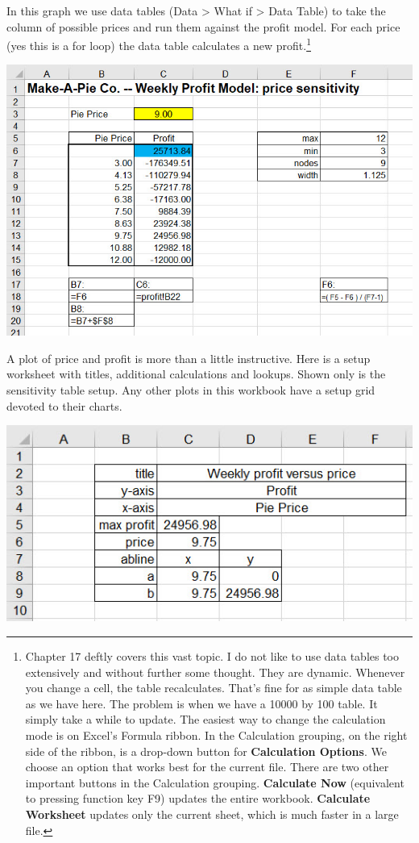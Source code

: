 \documentclass[
]{book}
\begin{document}
In this graph we use data tables (Data \textgreater{} What if \textgreater{} Data Table) to take the column of possible prices and run them against the profit model. For each price (yes this is a for loop) the data table calculates a new profit.\footnote{\citet{Winston2019} Chapter 17 deftly covers this vast topic. I do not like to use data tables too extensively and without further some thought. They are dynamic. Whenever you change a cell, the table recalculates. That's fine for as simple data table as we have here. The problem is when we have a 10000 by 100 table. It simply take a while to update. The easiest way to change the calculation mode is on Excel's Formula ribbon. In the Calculation grouping, on the right side of the ribbon, is a drop-down button for \textbf{Calculation Options}. We choose an option that works best for the current file. There are two other important buttons in the Calculation grouping. \textbf{Calculate Now} (equivalent to pressing function key F9) updates the entire workbook. \textbf{Calculate Worksheet} updates only the current sheet, which is much faster in a large file.}

\includegraphics{images/01/pie-sensitivity-price.jpg}

A plot of price and profit is more than a little instructive. Here is a setup worksheet with titles, additional calculations and lookups. Shown only is the sensitivity table setup. Any other plots in this workbook have a setup grid devoted to their charts.

\includegraphics{images/01/pie-plot-setup.jpg}
\end{document}
